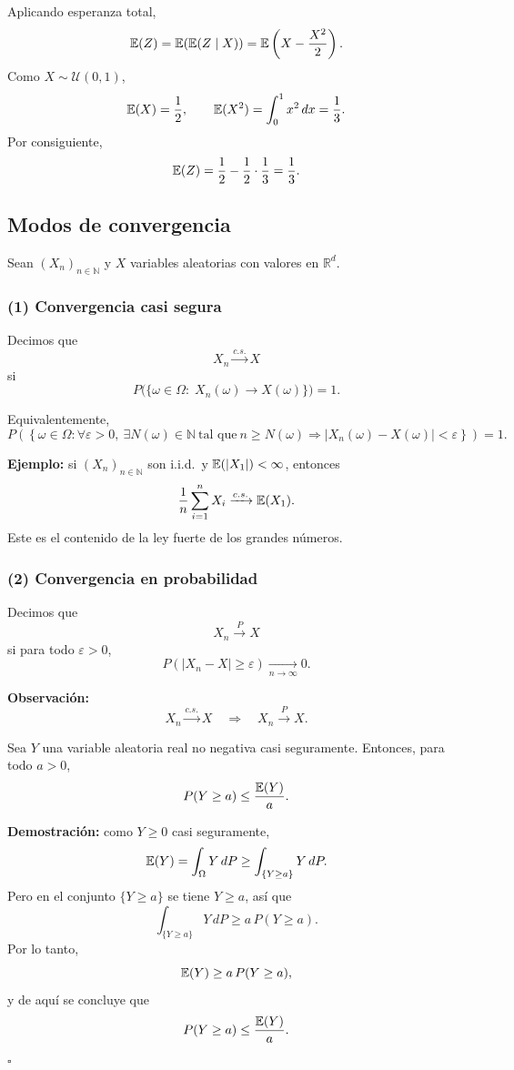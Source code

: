 Aplicando esperanza total,
\[
\mathbb{E}(Z)=\mathbb{E}(\mathbb{E}(Z\mid X))
=
\mathbb{E}\left(X-\frac{X^2}{2}\right).
\]
Como \(X\sim \mathcal{U}(0,1)\),
\[
\mathbb{E}(X)=\frac12,
\qquad
\mathbb{E}(X^2)=\int_0^1 x^2\,dx=\frac13.
\]
Por consiguiente,
\[
\mathbb{E}(Z)=\frac12-\frac12\cdot\frac13=\frac13.
\]

\subsection{Modos de convergencia}

Sean \((X_n)_{n\in\mathbb{N}}\) y \(X\) variables aleatorias con valores en \(\mathbb{R}^d\).

\subsubsection*{(1) Convergencia casi segura}

Decimos que
\[
X_n \xrightarrow{c.s.} X
\]
si
\[
P\big(\{\omega\in\Omega:\; X_n(\omega)\to X(\omega)\}\big)=1.
\]

Equivalentemente,
\[
P\left(\left\{\omega\in\Omega:\forall \varepsilon>0,\ \exists N(\omega)\in\mathbb{N}\ \text{tal que}\ n\geq N(\omega)\Rightarrow |X_n(\omega)-X(\omega)|<\varepsilon\right\}\right)=1.
\]

\medskip

\noindent
\textbf{Ejemplo:} si \((X_n)_{n\in\mathbb{N}}\) son i.i.d.\ y \(\mathbb{E}(|X_1|)<\infty\), entonces
\[
\frac1n\sum_{i=1}^n X_i \xrightarrow{c.s.} \mathbb{E}(X_1).
\]
Este es el contenido de la ley fuerte de los grandes números.

\subsubsection*{(2) Convergencia en probabilidad}

Decimos que
\[
X_n \xrightarrow{P} X
\]
si para todo \(\varepsilon>0\),
\[
P(|X_n-X|\geq \varepsilon)\xrightarrow[n\to\infty]{}0.
\]

\medskip

\noindent
\textbf{Observación:}
\[
X_n\xrightarrow{c.s.}X
\quad\Longrightarrow\quad
X_n\xrightarrow{P}X.
\]

\begin{prop}
Sea \(Y\) una variable aleatoria real no negativa casi seguramente. Entonces, para todo \(a>0\),
\[
P(Y\geq a)\leq \frac{\mathbb{E}(Y)}{a}.
\]
\end{prop}

\textbf{Demostración:} como \(Y\geq 0\) casi seguramente,
\[
\mathbb{E}(Y)=\int_\Omega Y\,dP \geq \int_{\{Y\geq a\}} Y\,dP.
\]
Pero en el conjunto \(\{Y\geq a\}\) se tiene \(Y\geq a\), así que
\[
\int_{\{Y\geq a\}} Y\,dP \geq a\,P(Y\geq a).
\]
Por lo tanto,
\[
\mathbb{E}(Y)\geq a\,P(Y\geq a),
\]
y de aquí se concluye que
\[
P(Y\geq a)\leq \frac{\mathbb{E}(Y)}{a}.
\]
\hfill \(\square\)

